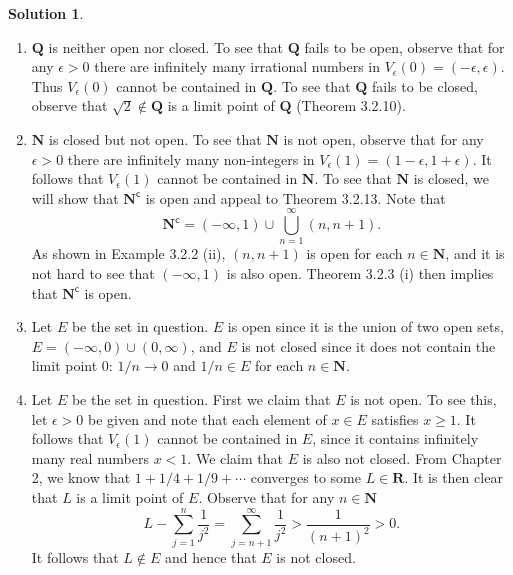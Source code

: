 \documentclass[12pt]{article}
\theoremstyle{definition}
\theoremstyle{exercise}
\theoremstyle{solution}
\newtheorem*{solution}{Solution}
\newcommand{\setcomp}[1]{#1^{\mathsf{c}}}
\newcommand{\N}{\mathbf{N}}
\newcommand{\Q}{\mathbf{Q}}
\newcommand{\R}{\mathbf{R}}
\begin{document}
\begin{solution}
    \begin{enumerate}
        \item \( \Q \) is neither open nor closed. To see that \( \Q \) fails to be open, observe that for any \( \epsilon > 0 \) there are infinitely many irrational numbers in \( V_{\epsilon}(0) = (-\epsilon, \epsilon) \). Thus \( V_{\epsilon}(0) \) cannot be contained in \( \Q \). To see that \( \Q \) fails to be closed, observe that \( \sqrt{2} \not\in \Q \) is a limit point of \( \Q \) (Theorem 3.2.10).

        \item \( \N \) is closed but not open. To see that \( \N \) is not open, observe that for any \( \epsilon > 0 \) there are infinitely many non-integers in \( V_{\epsilon}(1) = (1 - \epsilon, 1 + \epsilon) \). It follows that \( V_{\epsilon}(1) \) cannot be contained in \( \N \). To see that \( \N \) is closed, we will show that \( \setcomp{\N} \) is open and appeal to Theorem 3.2.13. Note that
        \[
            \setcomp{\N} = (-\infty, 1) \cup \bigcup_{n=1}^{\infty} (n, n + 1).
        \]
        As shown in Example 3.2.2 (ii), \( (n, n + 1) \) is open for each \( n \in \N \), and it is not hard to see that \( (-\infty, 1) \) is also open. Theorem 3.2.3 (i) then implies that \( \setcomp{\N} \) is open.

        \item Let \( E \) be the set in question. \( E \) is open since it is the union of two open sets, \( E = (-\infty, 0) \cup (0, \infty) \), and \( E \) is not closed since it does not contain the limit point \( 0 \): \( 1/n \to 0 \) and \( 1/n \in E \) for each \( n \in \N \).

        \item Let \( E \) be the set in question. First we claim that \( E \) is not open. To see this, let \( \epsilon > 0 \) be given and note that each element of \( x \in E \) satisfies \( x \geq 1 \). It follows that \( V_{\epsilon}(1) \) cannot be contained in \( E \), since it contains infinitely many real numbers \( x < 1 \). We claim that \( E \) is also not closed. From Chapter 2, we know that \( 1 + 1/4 + 1/9 + \cdots \) converges to some \( L \in \R \). It is then clear that \( L \) is a limit point of \( E \). Observe that for any \( n \in \N \)
        \[
            L - \sum_{j=1}^n \frac{1}{j^2} = \sum_{j=n+1}^{\infty} \frac{1}{j^2} > \frac{1}{(n+1)^2} > 0.
        \]
        It follows that \( L \not\in E \) and hence that \( E \) is not closed.


\end{enumerate}
\end{solution}
\end{document}
